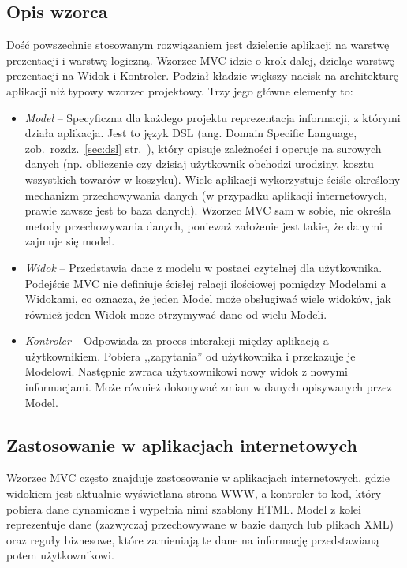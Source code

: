 \documentclass[a4paper,12pt,oneside]{report}
\begin{document}
\subsection{Opis wzorca}
\label{subsec:mvc-opis}
Dość powszechnie stosowanym rozwiązaniem jest dzielenie aplikacji na warstwę prezentacji i warstwę logiczną. Wzorzec MVC idzie o krok dalej, dzieląc warstwę prezentacji na Widok i Kontroler. Podział kładzie większy nacisk na architekturę aplikacji niż typowy wzorzec projektowy. Trzy jego główne elementy to:
\begin{itemize}
  \item \emph{Model} -- Specyficzna dla każdego projektu reprezentacja informacji, z którymi działa aplikacja. Jest to język DSL (ang. Domain Specific Language, zob.~rozdz.~\ref{sec:dsl} str.~\pageref{sec:dsl}), który opisuje zależności i operuje na surowych danych (np. obliczenie czy dzisiaj użytkownik obchodzi urodziny, kosztu wszystkich towarów w koszyku). Wiele aplikacji wykorzystuje ściśle określony mechanizm przechowywania danych (w przypadku aplikacji internetowych, prawie zawsze jest to baza danych). Wzorzec MVC sam w sobie, nie określa metody przechowywania danych, ponieważ założenie jest takie, że danymi zajmuje się model.
  \item \emph{Widok} -- Przedstawia dane z modelu w postaci czytelnej dla użytkownika. Podejście MVC nie definiuje ścisłej relacji ilościowej pomiędzy Modelami a Widokami, co oznacza, że jeden Model może obsługiwać wiele widoków, jak również jeden Widok może otrzymywać dane od wielu Modeli.
  \item \emph{Kontroler} -- Odpowiada za proces interakcji między aplikacją a użytkownikiem. Pobiera ,,zapytania'' od użytkownika i przekazuje je Modelowi. Następnie zwraca użytkownikowi nowy widok z nowymi informacjami. Może również dokonywać zmian w danych opisywanych przez Model.
\end{itemize}

\subsection{Zastosowanie w aplikacjach internetowych}
\label{subsec:mvc-web}
Wzorzec MVC często znajduje zastosowanie w aplikacjach internetowych, gdzie widokiem jest aktualnie wyświetlana strona WWW, a kontroler to kod, który pobiera dane dynamiczne i wypełnia nimi szablony HTML. Model z kolei reprezentuje dane (zazwyczaj przechowywane w bazie danych lub plikach XML) oraz reguły biznesowe, które zamieniają te dane na informację przedstawianą potem użytkownikowi.
\end{document}
